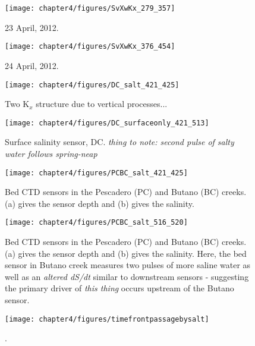 \begin{figure}
	\texttt{[image: chapter4/figures/SvXwKx\_279\_357]} 
\caption{23 April, 2012. } \label{fig:Kx423}
\end{figure}



\begin{figure}
	\texttt{[image: chapter4/figures/SvXwKx\_376\_454]} 
\caption{24 April, 2012.} \label{fig:Kx424}
\end{figure}



\begin{figure}
	\texttt{[image: chapter4/figures/DC\_salt\_421\_425]}
	\caption{Two K$_x$ structure due to vertical processes...} \label{fig:SDCApr2012} \label{fig:DC_salt_421_425}
\end{figure}


\begin{figure}
	\texttt{[image: chapter4/figures/DC\_surfaceonly\_421\_513]}
	\caption{Surface salinity sensor, DC. \emph{thing to note: second pulse of salty water follows spring-neap}} \label{fig:SsurfLT}
\end{figure}


\begin{figure}
	\texttt{[image: chapter4/figures/PCBC\_salt\_421\_425]}
	\caption{Bed CTD sensors in the Pescadero (PC) and Butano (BC) creeks. (a) gives the sensor depth and (b) gives the salinity.} \label{fig:PCBC421:425}
\end{figure}



\begin{figure}
	\texttt{[image: chapter4/figures/PCBC\_salt\_516\_520]}
	\caption{Bed CTD sensors in the Pescadero (PC) and Butano (BC) creeks. (a) gives the sensor depth and (b) gives the salinity. Here, the bed sensor in Butano creek measures two pulses of more saline water as well as an \emph{altered dS/dt} similar to downstream sensors - suggesting the primary driver of \emph{this thing} occurs upstream of the Butano sensor.}  \label{fig:PCBC511:516}
\end{figure}


\begin{figure}
	\texttt{[image: chapter4/figures/timefrontpassagebysalt]}
	\caption{.}  \label{fig:tvsS}
\end{figure}



